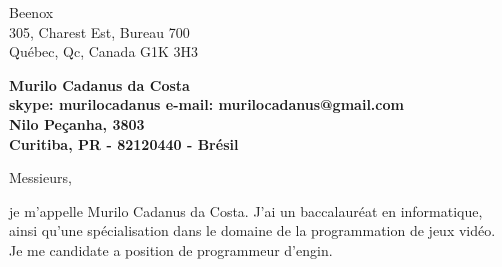 \documentclass[11pt]{letter} %
\begin{document}

\begin{letter}{%
Beenox \\
305, Charest Est, Bureau 700 \\
Québec, Qc, Canada G1K 3H3} 


\begin{center}
\large\bf Murilo Cadanus da Costa \\ %
skype: murilocadanus e-mail: murilocadanus@gmail.com \\
Nilo Peçanha, 3803 \\ Curitiba, PR - 82120440 - Brésil
\end{center} 
\vfill

\signature{Murilo C. da Costa} %


\opening{Messieurs,} 


je m'appelle Murilo Cadanus da Costa. J'ai un baccalauréat en informatique, ainsi qu'une spécialisation dans le domaine de la programmation de jeux vidéo. Je me candidate a position de programmeur d'engin.


\end{letter}
\end{document}
